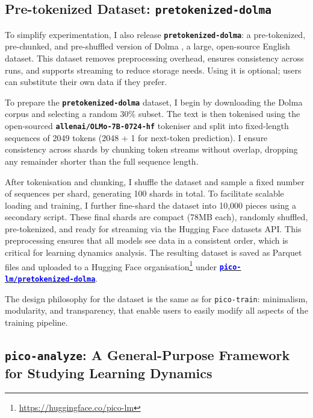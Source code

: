 \subsection{Pre-tokenized Dataset: \texttt{pretokenized-dolma}}

To simplify experimentation, I also release \textbf{\texttt{pretokenized-dolma}}: a pre-tokenized, pre-chunked, and pre-shuffled version of Dolma \citep{soldaini2024dolma}, a large, open-source English dataset. This dataset removes preprocessing overhead, ensures consistency across runs, and supports streaming to reduce storage needs. Using it is optional; users can substitute their own data if they prefer. 

To prepare the \textbf{\texttt{pretokenized-dolma}} dataset, I begin by downloading the Dolma corpus and selecting a random 30\% subset. The text is then tokenised using the open-sourced \textbf{\texttt{allenai/OLMo-7B-0724-hf}} tokeniser and split into fixed-length sequences of 2049 tokens (2048 + 1 for next-token prediction). I ensure consistency across shards by chunking token streams without overlap, dropping any remainder shorter than the full sequence length.

After tokenisation and chunking, I shuffle the dataset and sample a fixed number of sequences per shard, generating 100 shards in total. To facilitate scalable loading and training, I further fine-shard the dataset into 10,000 pieces using a secondary script. These final shards are compact (78MB each), randomly shuffled, pre-tokenized, and ready for streaming via the Hugging Face datasets API. This preprocessing ensures that all models see data in a consistent order, which is critical for learning dynamics analysis. The resulting dataset is saved as Parquet files and uploaded to a Hugging Face organisation\footnote{\url{https://huggingface.co/pico-lm}} under \href{https://huggingface.co/datasets/pico-lm/pretokenized-dolma}{\textcolor{blue}{\textbf{\texttt{pico-lm/pretokenized-dolma}}}}.

The design philosophy for the dataset is the same as for \texttt{pico-train}: minimalism, modularity, and transparency, that enable users to easily modify all aspects of the training pipeline. 

\subsection{\texttt{pico-analyze}: A General-Purpose Framework for Studying Learning Dynamics}

